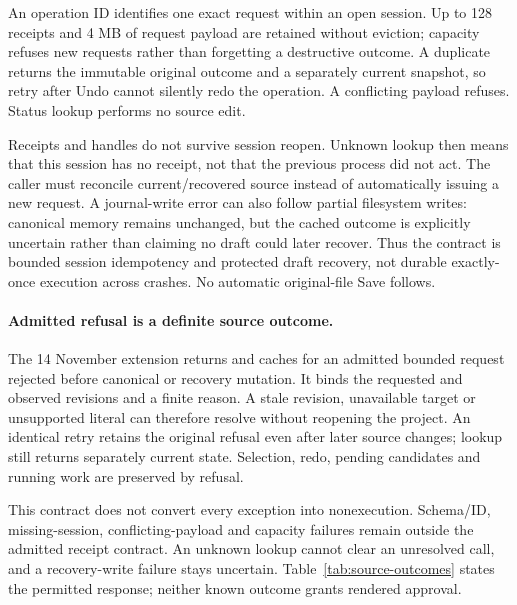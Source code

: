 An operation ID identifies one exact request within an open session. Up to 128
receipts and 4 MB of request payload are retained without eviction; capacity
refuses new requests rather than forgetting a destructive outcome. A duplicate
returns the immutable original outcome and a separately current snapshot, so
retry after Undo cannot silently redo the operation. A conflicting payload
refuses. Status lookup performs no source edit.

Receipts and handles do not survive session reopen. Unknown lookup then means
that this session has no receipt, not that the previous process did not act.
The caller must reconcile current/recovered source instead of automatically
issuing a new request. A journal-write error can also follow partial filesystem
writes: canonical memory remains unchanged, but the cached outcome is explicitly
uncertain rather than claiming no draft could later recover. Thus the contract
is bounded session idempotency and protected draft recovery, not durable
exactly-once execution across crashes. No automatic original-file Save follows.

\paragraph{Admitted refusal is a definite source outcome.}
The 14 November extension returns and caches 
for an admitted bounded request rejected before canonical or recovery mutation.
It binds the requested and observed revisions and a finite reason. A stale
revision, unavailable target or unsupported literal can therefore resolve
without reopening the project. An identical retry retains the original refusal
even after later source changes; lookup still returns separately current state.
Selection, redo, pending candidates and running work are preserved by refusal.

This contract does not convert every exception into nonexecution. Schema/ID,
missing-session, conflicting-payload and capacity failures remain outside the
admitted receipt contract. An unknown lookup cannot clear an unresolved call,
and a recovery-write failure stays uncertain. Table~\ref{tab:source-outcomes}
states the permitted response; neither known outcome grants rendered approval.

